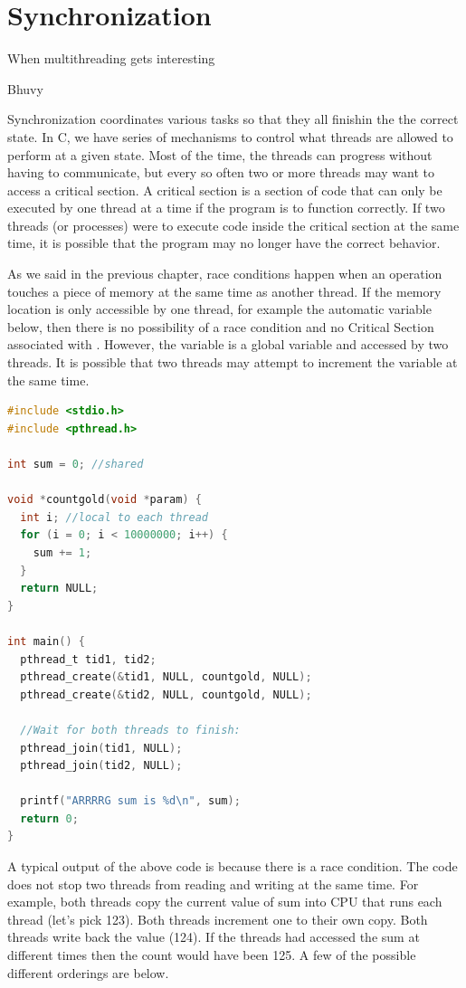 \chapter{Synchronization}

\epigraph{When multithreading gets interesting}{Bhuvy}

Synchronization coordinates various tasks so that they all finishin the the correct state.
In C, we have series of mechanisms to control what threads are allowed to perform at a given state.
Most of the time, the threads can progress without having to communicate, but every so often two or more threads may want to access a critical section.
A critical section is a section of code that can only be executed by one thread at a time if the program is to function correctly.
If two threads (or processes) were to execute code inside the critical section at the same time, it is possible that the program may no longer have the correct behavior.

As we said in the previous chapter, race conditions happen when an operation touches a piece of memory at the same time as another thread.
If the memory location is only accessible by one thread, for example the automatic variable  below, then there is no possibility of a race condition and no Critical Section associated with .
However, the  variable is a global variable and accessed by two threads.
It is possible that two threads may attempt to increment the variable at the same time.

\begin{lstlisting}[language=C]
#include <stdio.h>
#include <pthread.h>

int sum = 0; //shared

void *countgold(void *param) {
  int i; //local to each thread
  for (i = 0; i < 10000000; i++) {
    sum += 1;
  }
  return NULL;
}

int main() {
  pthread_t tid1, tid2;
  pthread_create(&tid1, NULL, countgold, NULL);
  pthread_create(&tid2, NULL, countgold, NULL);

  //Wait for both threads to finish:
  pthread_join(tid1, NULL);
  pthread_join(tid2, NULL);

  printf("ARRRRG sum is %d\n", sum);
  return 0;
}
\end{lstlisting}

A typical output of the above code is  because there is a race condition.
The code does not stop two threads from reading and writing  at the same time.
For example, both threads copy the current value of sum into CPU that runs each thread (let's pick 123).
Both threads increment one to their own copy.
Both threads write back the value (124).
If the threads had accessed the sum at different times then the count would have been 125.
A few of the possible different orderings are below.

